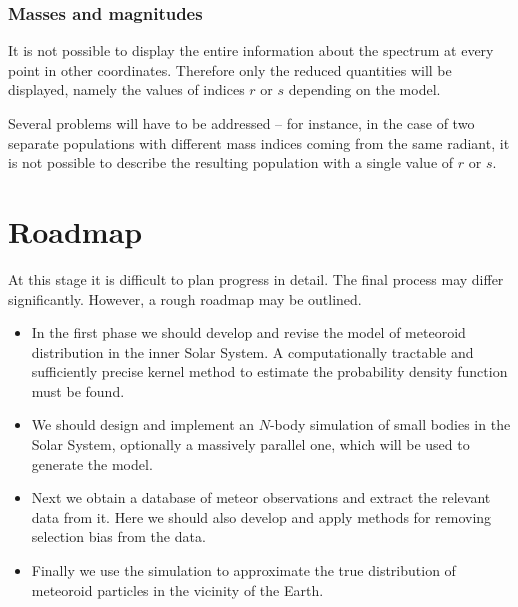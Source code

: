         \subsubsection{Masses and magnitudes} \label{iovm}
            It is not possible to display the entire information about the spectrum at every point
            in other coordinates. Therefore only the reduced quantities will be displayed,
            namely the values of indices $r$ or $s$ depending on the model.

            Several problems will have to be addressed -- for instance, in the case of
            two separate populations with different mass indices coming from the same radiant,
            it is not possible to describe the resulting population with a single value of $r$ or $s$.

\section{Roadmap} \label{ir}
    At this stage it is difficult to plan progress in detail. The final process may differ significantly.
    However, a rough roadmap may be outlined.

    \begin{itemize}
        \item In the first phase we should develop and revise the model of meteoroid
            distribution in the inner Solar System. A computationally tractable and sufficiently
            precise kernel method to estimate the probability density function must be found.
        \item We should design and implement an $N$-body simulation of small bodies in the Solar System,
            optionally a massively parallel one, which will be used to generate the model.
        \item Next we obtain a database of meteor observations and extract the relevant data from it.
            Here we should also develop and apply methods for removing selection bias from the data.
        \item Finally we use the simulation to approximate the true distribution of meteoroid particles
            in the vicinity of the Earth.
    \end{itemize}

